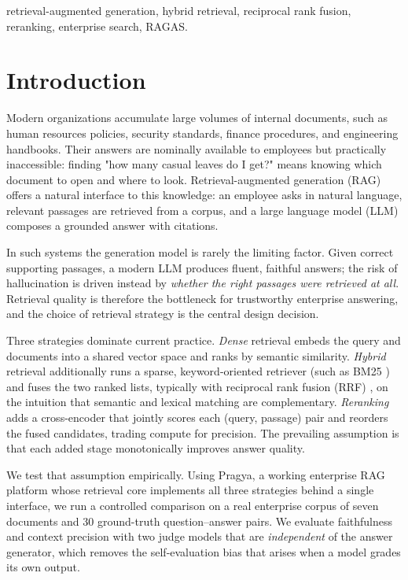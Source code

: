 \documentclass[conference]{IEEEtran}
\begin{document}
\begin{IEEEkeywords}
retrieval-augmented generation, hybrid retrieval, reciprocal rank fusion,
reranking, enterprise search, RAGAS.
\end{IEEEkeywords}

\section{Introduction}
Modern organizations accumulate large volumes of internal documents, such as
human resources policies, security standards, finance procedures, and
engineering handbooks. Their answers are nominally available to employees but
practically inaccessible: finding "how many casual leaves do I get?" means knowing which
document to open and where to look. Retrieval-augmented generation (RAG)
\cite{lewis2020retrieval} offers a natural interface to this knowledge: an employee asks
in natural language, relevant passages are retrieved from a corpus, and a large
language model (LLM) composes a grounded answer with citations.

In such systems the generation model is rarely the limiting factor. Given
correct supporting passages, a modern LLM produces fluent, faithful answers; the
risk of hallucination is driven instead by \emph{whether the right passages were
retrieved at all}. Retrieval quality is therefore the bottleneck for trustworthy
enterprise answering, and the choice of retrieval strategy is the central design
decision.

Three strategies dominate current practice. \emph{Dense} retrieval embeds the
query and documents into a shared vector space and ranks by semantic similarity.
\emph{Hybrid} retrieval additionally runs a sparse, keyword-oriented retriever
(such as BM25 \cite{robertson2009probabilistic}) and fuses the two ranked lists, typically with
reciprocal rank fusion (RRF) \cite{cormack2009reciprocal}, on the intuition that semantic and
lexical matching are complementary. \emph{Reranking} adds a cross-encoder
\cite{nogueira2019passage} that jointly scores each (query, passage) pair and reorders
the fused candidates, trading compute for precision. The prevailing assumption is
that each added stage monotonically improves answer quality.

We test that assumption empirically. Using Pragya, a working enterprise RAG
platform whose retrieval core implements all three strategies behind a single
interface, we run a controlled comparison on a real enterprise corpus of seven
documents and 30 ground-truth question--answer pairs. We
evaluate faithfulness and context precision with two judge models that are
\emph{independent} of the answer generator, which removes the self-evaluation
bias that arises when a model grades its own output.
\end{document}

